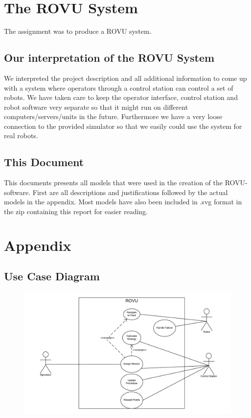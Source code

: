 
\section*{The ROVU System}
The assignment was to produce a ROVU system. 
\subsection*{Our interpretation of the ROVU System}
We interpreted the project description and all additional information to come up with a system where operators through a control station can control a set of robots. 
We have taken care to keep the operator interface, control station and robot software very separate so that it might run on different computers/servers/units in the future.
Furthermore we have a very loose connection to the provided simulator so that we easily could use the system for real robots.
\subsection*{This Document}
This documents presents all models that were used in the creation of the ROVU-software. First are all descriptions and justifications followed by the actual models in the appendix. Most models have also been included in .svg format in the zip containing this report for easier reading.
\newpage
\tableofcontents
\newpage

\newpage

\newpage

\newpage

\newpage

\newpage


\newpage
\section{Appendix}
\subsection{Use Case Diagram}
\begin{figure}[H]
\includegraphics[width=16cm]{docs/assignments/Final_project/use_case_diagram.png}
\end{figure}
\newpage

